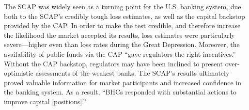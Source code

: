 \documentclass[12pt]{article}
\begin{document}
The SCAP was widely seen as a turning point for the U.S. banking system,
due both to the SCAP's credibly tough loss estimates, as well as the
capital backstop provided by the CAP. In order to make the test credible,
and therefore increase the likelihood the market accepted its results,
loss estimates were particularly severe---higher even than loss rates
during the Great Depression. Moreover, the availability of public funds
via the CAP ``gave regulators the right incentives.''\citep{Bernanke}
Without the CAP backstop, regulators may have been inclined to present
over-optimistic assessments of the weakest banks. The SCAP's results ultimately proved valuable information for market participants and increased confidence in the banking system. As a result, ``BHCs responded with substantial actions to improve capital [positions].''\citep{Hirtle}
%
\end{document}
